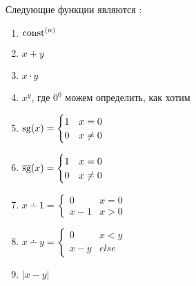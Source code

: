 \begin{lm}
    Следующие функции являются \prf:
	\begin{enumerate}
	\item $ \textmd{const} ^{(n)}$ 
	\item $ x + y$ 
	\item $ x\cdot y$ 
	\item $ x ^{y}$, где $ 0^{0}$ можем определить, как хотим
	\item $ \operatorname{sg}(x) = \begin{cases}
			1 & x= 0 \\
			0 & x\ne 0
		\end{cases}$
	\item $ \operatorname{\overline{sg}}(x) = \begin{cases}
			1 & x= 0 \\
			0 & x\ne 0
		\end{cases}$
	\item $ x \dotminus 1 = \begin{cases}
			0 & x = 0 \\
			x - 1 & x > 0
		\end{cases}$ 
	\item $ x \dotminus y = \begin{cases}
			0 & x < y \\
			x - y & else
		\end{cases}$ 
	\item $ \lvert x - y \rvert $
	\end{enumerate}
\end{lm}
